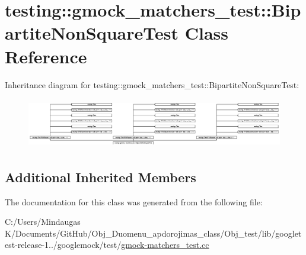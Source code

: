 \hypertarget{classtesting_1_1gmock__matchers__test_1_1_bipartite_non_square_test}{}\section{testing\+::gmock\+\_\+matchers\+\_\+test\+::Bipartite\+Non\+Square\+Test Class Reference}
\label{classtesting_1_1gmock__matchers__test_1_1_bipartite_non_square_test}
Inheritance diagram for testing\+::gmock\+\_\+matchers\+\_\+test\+::Bipartite\+Non\+Square\+Test\+:\begin{figure}[H]
\begin{center}
\leavevmode
\includegraphics[height=2.215628cm]{d3/d7a/classtesting_1_1gmock__matchers__test_1_1_bipartite_non_square_test}
\end{center}
\end{figure}
\subsection*{Additional Inherited Members}


The documentation for this class was generated from the following file\+:\begin{DoxyCompactItemize}
\item 
C\+:/\+Users/\+Mindaugas K/\+Documents/\+Git\+Hub/\+Obj\+\_\+\+Duomenu\+\_\+apdorojimas\+\_\+class/\+Obj\+\_\+test/lib/googletest-\/release-\/1../googlemock/test/\mbox{\hyperlink{_obj__test_2lib_2googletest-release-1_88_81_2googlemock_2test_2gmock-matchers__test_8cc}{gmock-\/matchers\+\_\+test.\+cc}}\end{DoxyCompactItemize}
